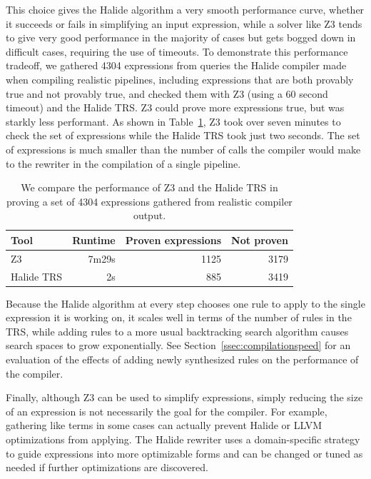 \documentclass[acmsmall,review,anonymous]{acmart}\settopmatter{printfolios=true,printccs=false,printacmref=false}
\begin{document}
This choice gives the Halide algorithm a very smooth performance curve, whether it succeeds or fails in simplifying an input expression, while a solver like Z3 tends to give very good performance in the majority of cases but gets bogged down in difficult cases, requiring the use of timeouts. To demonstrate this performance tradeoff, we gathered 4304 expressions from queries the Halide compiler made when compiling realistic pipelines, including expressions that are both provably true and not provably true, and checked them with Z3 (using a 60 second timeout) and the Halide TRS. Z3 could prove more expressions true, but was starkly less performant. As shown in Table~\ref{tab:simplifiervsz3}, Z3 took over seven minutes to check the set of expressions while the Halide TRS took just two seconds. The set of expressions is much smaller than the number of calls the compiler would make to the rewriter in the compilation of a single pipeline.

\begin{table}
\caption{We compare the performance of Z3 and the Halide TRS in proving a set of 4304 expressions gathered from realistic compiler output.}
\begin{tabular}{l|r|r|r}
Tool & Runtime & Proven expressions & Not proven \\
\hline
Z3 & 7m29s & 1125 & 3179 \\
Halide TRS & 2s & 885 & 3419 
\end{tabular}
\label{tab:simplifiervsz3}
\end{table}

Because the Halide algorithm at every step chooses one rule to apply to the single expression it is working on, it scales well in terms of the number of rules in the TRS, while adding rules to a more usual backtracking search algorithm causes search spaces to grow exponentially. See Section~\ref{ssec:compilationspeed} for an evaluation of the effects of adding newly synthesized rules on the performance of the compiler. 

Finally, although Z3 can be used to simplify expressions, simply reducing the size of an expression is not necessarily the goal for the compiler. For example, gathering like terms in some cases can actually prevent Halide or LLVM optimizations from applying. The Halide rewriter uses a domain-specific strategy to guide expressions into more optimizable forms and can be changed or tuned as needed if further optimizations are discovered. 

\end{document}
